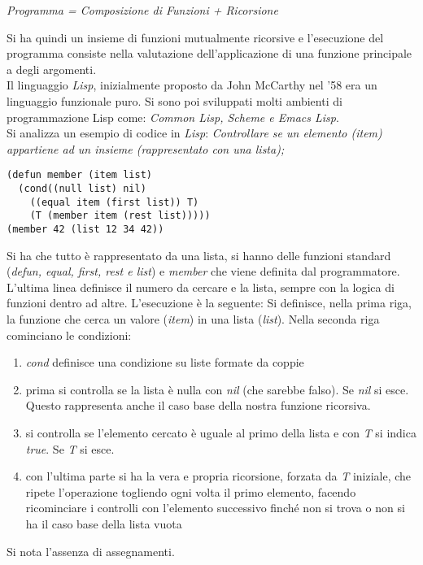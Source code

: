 \documentclass[a4paper,12pt, oneside]{book}
\begin{document}
\begin{enumerate}
\begin{center}
\textit{Programma = Composizione di Funzioni + Ricorsione}
\end{center}
Si ha quindi un insieme di funzioni mutualmente ricorsive e l'esecuzione del programma consiste nella valutazione dell'applicazione di una funzione principale a degli argomenti.\\
Il linguaggio \textit{Lisp}, inizialmente proposto da John McCarthy nel '58 era un linguaggio funzionale puro. Si sono poi sviluppati molti ambienti di programmazione Lisp come: \textit{Common Lisp, Scheme e Emacs Lisp}.\\
Si analizza un esempio di codice in \textit{Lisp}:
\textit{Controllare se un elemento (item) appartiene ad un insieme (rappresentato con una lista);}
\begin{verbatim}
(defun member (item list)
  (cond((null list) nil)
    ((equal item (first list)) T)
    (T (member item (rest list)))))
(member 42 (list 12 34 42))
\end{verbatim}
Si ha che tutto è rappresentato da una lista, si hanno delle funzioni standard (\textit{defun, equal, first, rest e list}) e \textit{member} che viene definita dal programmatore. L'ultima linea definisce il numero da cercare e la lista, sempre con la logica di funzioni dentro ad altre. L'esecuzione è la seguente: Si definisce, nella prima riga, la funzione che cerca un valore (\textit{item}) in una lista (\textit{list}). Nella seconda riga cominciano le condizioni: 
\begin{enumerate}
\item \textit{cond} definisce una condizione su liste formate da coppie
\item prima si controlla se la lista è nulla con \textit{nil} (che sarebbe falso). Se \textit{nil} si esce. Questo rappresenta anche il caso base della nostra funzione ricorsiva.
\item si controlla se l'elemento cercato è uguale al primo della lista e con \textit{T} si indica \textit{true}. Se \textit{T} si esce.
\item con l'ultima parte si ha la vera e propria ricorsione, forzata da \textit{T} iniziale, che ripete l'operazione togliendo ogni volta il primo elemento, facendo ricominciare i controlli con l'elemento successivo finché non si trova o non si ha il caso base della lista vuota
\end{enumerate}
Si nota l'assenza di assegnamenti.
\end{enumerate}
\end{document}
